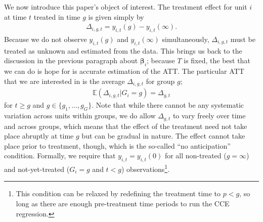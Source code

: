 \documentclass[12pt,fleqn]{article}
\def\+#1{\boldsymbol{#1}}
\begin{document}
\bigskip

We now introduce this paper's object of interest. The treatment effect for unit $i$ at time $t$ treated in time $g$ is given simply by
\begin{align}
\Delta_{i,g,t} = y_{i,t}(g) - y_{i,t}(\infty) . \label{te}
\end{align}
Because we do not observe $y_{i,t}(g)$ and $y_{i,t}(\infty)$ simultaneously, $\Delta_{i,g,t}$ must be treated as unknown and estimated from the data. This brings us back to the discussion in the previous paragraph about $\+\beta_i$; because $T$ is fixed, the best that we can do is hope for is accurate estimation of the ATT. The particular ATT that we are interested in is the average $\Delta_{i,g,t}$ for group $g$;
\begin{align}
\mathbb{E}(\Delta_{i,g,t}| G_i = g ) = \Delta_{g,t} \label{att}
\end{align}
for $t \geq g$ and $g \in \{g_1,...,g_G\}$. Note that while there cannot be any systematic variation across units within groups, we do allow $\Delta_{g,t}$ to vary freely over time and across groups, which means that the effect of the treatment need not take place abruptly at time $g$ but can be gradual in nature. The effect cannot take place prior to treatment, though, which is the so-called ``no anticipation'' condition. Formally, we require that $y_{i,t} = y_{i,t}(0)$ for all non-treated ($g = \infty$) and not-yet-treated ($G_i = g$ and $t < g$) observations\footnote{This condition can be relaxed by redefining the treatment time to $p < g$, so long as there are enough pre-treatment time periods to run the CCE regression.}. 
\end{document}
